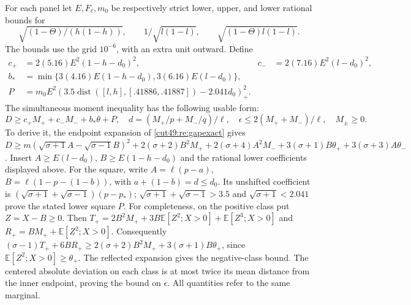 \documentclass[11pt,a4paper]{article}
\numberwithin{equation}{section}
\theoremstyle{definition}
\theoremstyle{remark}
\newcommand{\E}{\mathbb E}
\newcommand{\pos}[1]{(#1)_+}
\begin{document}
For each panel let $E,F_\ell,m_0$ be respectively strict lower, upper,
and lower rational bounds for
\[
 \sqrt{(1-\Theta)/(h(1-h))},\qquad
 1/\sqrt{l(1-l)},\qquad \sqrt{(1-\Theta)l(1-l)}.
\]
The bounds use the grid $10^{-6}$, with an extra unit outward. Define
\begin{align*}
 c_+&=2(5.16)E^2(1-h-d_0)^2,&
 c_-&=2(7.16)E^2(l-d_0)^2,\\
 b_*&=\min\{3(4.16)E(1-h-d_0),3(6.16)E(l-d_0)\},\\
 P&=m_0E^2\pos{3.5\operatorname{dist}([l,h],[.41886,.41887])-2.041d_0}^2.
\end{align*}
The simultaneous moment inequality has the following usable form:
\begin{equation}\label{cut49:conf:moment}
 D\ge c_+M_++c_-M_-+b_*\theta+P,\quad
 d=(M_+/p+M_-/q)/\ell,\quad
 \epsilon\le2(M_++M_-)/\ell,\quad M_\pm\ge0.
\end{equation}
To derive it, the endpoint expansion of \eqref{cut49:re:gapexact} gives
$D\ge m(\sqrt{\sigma+1}A-\sqrt{\sigma-1}B)^2
+2(\sigma+2)B^2M_++2(\sigma+4)A^2M_-
+3(\sigma+1)B\theta_++3(\sigma+3)A\theta_-$.
Insert $A\ge E(l-d_0)$, $B\ge E(1-h-d_0)$ and the rational lower
coefficients displayed above. For the square, write
$A=\ell(p-a)$, $B=\ell(1-p-(1-b))$, with
$a+(1-b)=d\le d_0$. Its unshifted coefficient is
$(\sqrt{\sigma+1}+\sqrt{\sigma-1})(p-p_*)$;
$\sqrt{\sigma+1}+\sqrt{\sigma-1}>3.5$ and
$\sqrt{\sigma+1}<2.041$ prove the stated lower square $P$.
For completeness, on the positive class put $Z=X-B\ge0$.
Then $T_+=2B^2M_++3B\E[Z^2;X>0]+\E[Z^3;X>0]$ and
$R_+=BM_++\E[Z^2;X>0]$. Consequently
$(\sigma-1)T_++6BR_+\ge2(\sigma+2)B^2M_+
+3(\sigma+1)B\theta_+$, since $\E[Z^2;X>0]\ge\theta_+$.
The reflected expansion gives the negative-class bound.
The centered absolute deviation on each class is at most twice its
mean distance from the inner endpoint, proving the bound on $\epsilon$.
All quantities refer to the same marginal.
\end{document}
